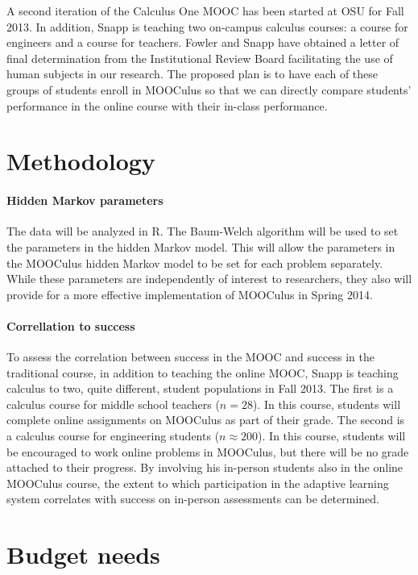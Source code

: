 \documentclass[12pt]{article}
\begin{document}
A second iteration of the Calculus One MOOC has been started at OSU
for Fall 2013.  In addition, Snapp is teaching two on-campus calculus
courses: a course for engineers and a course for teachers.  Fowler and
Snapp have obtained a letter of final determination from the
Institutional Review Board facilitating the use of human subjects in
our research.  The proposed plan is to have each of these groups of
students enroll in MOOCulus so that we can directly compare students'
performance in the online course with their in-class performance.


\section{Methodology}

\paragraph{Hidden Markov parameters}

The data will be analyzed in R. The Baum-Welch algorithm will be used
to set the parameters in the hidden Markov model. This will allow the
parameters in the MOOCulus hidden Markov model to be set for each
problem separately. While these parameters are independently of
interest to researchers, they also will provide for a more effective
implementation of MOOCulus in Spring 2014.

\paragraph{Correllation to success}

To assess the correlation between success in the MOOC and success in
the traditional course, in addition to teaching the online MOOC, Snapp
is teaching calculus to two, quite different, student populations in
Fall 2013.  The first is a calculus course for middle school teachers
($n=28$). In this course, students will complete online assignments on
MOOCulus as part of their grade.  The second is a calculus course for
engineering students ($n\approx 200$).  In this course, students will
be encouraged to work online problems in MOOCulus, but there will be
no grade attached to their progress.  By involving his in-person
students also in the online MOOCulus course, the extent to which
participation in the adaptive learning system correlates with success
on in-person assessments can be determined.




\section{Budget needs}
\end{document}
